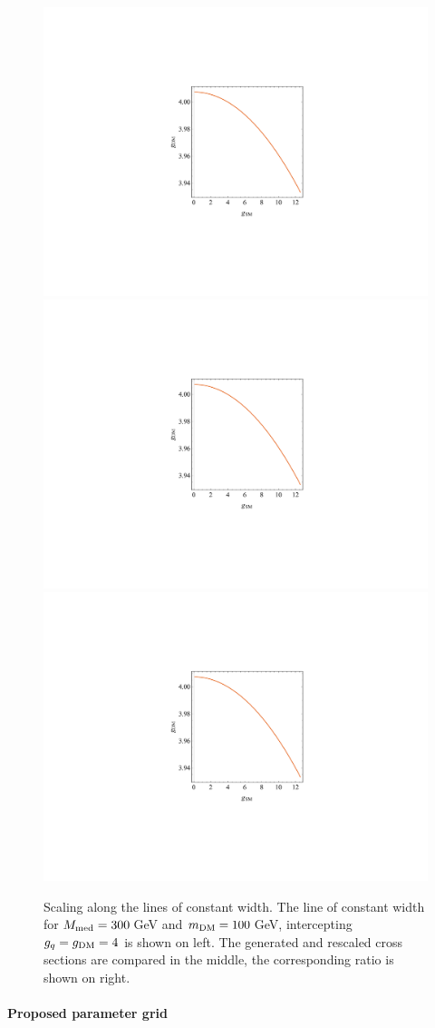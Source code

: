 \begin{figure}
\centering
\includegraphics[page=1, trim=310 200 310 200, clip, width=0.3\linewidth]{figures/monojet/rescalingexercise.pdf}
\includegraphics[page=2, trim=305 195 305 195, clip, width=0.3\linewidth]{figures/monojet/rescalingexercise.pdf}
\includegraphics[page=3, trim=300 190 300 190, clip, width=0.3\linewidth]{figures/monojet/rescalingexercise.pdf}
\caption{Scaling along the lines of constant width. The line of constant width for $M_{\rm{med}}=300$\,GeV and $m_{\rm{DM}}=100$\,GeV, intercepting $g_q=g_{\rm{DM}}=4$ is shown on left. The generated and rescaled cross sections are compared in the middle, the corresponding ratio is shown on right.}
\label{fig:monojet_scaling_constwidth}
\end{figure}


\paragraph{Proposed parameter grid}

